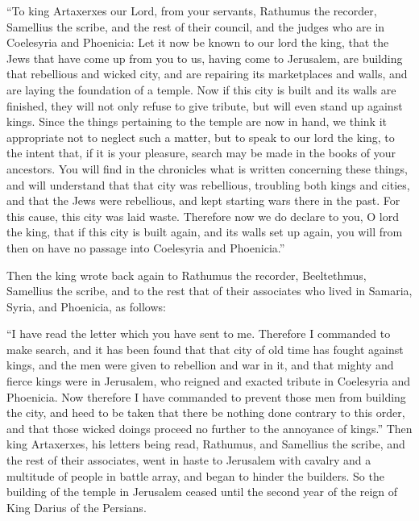  ``To king Artaxerxes our Lord, from your servants,
Rathumus the recorder, Samellius the scribe, and the rest of their
council, and the judges who are in Coelesyria and Phoenicia:
 Let it now be known to our lord the king, that the Jews
that have come up from you to us, having come to Jerusalem, are building
that rebellious and wicked city, and are repairing its marketplaces and
walls, and are laying the foundation of a temple.  Now if
this city is built and its walls are finished, they will not only refuse
to give tribute, but will even stand up against kings. 
Since the things pertaining to the temple are now in hand, we think it
appropriate not to neglect such a matter,  but to speak
to our lord the king, to the intent that, if it is your pleasure, search
may be made in the books of your ancestors.  You will
find in the chronicles what is written concerning these things, and will
understand that that city was rebellious, troubling both kings and
cities,  and that the Jews were rebellious, and kept
starting wars there in the past. For this cause, this city was laid
waste.  Therefore now we do declare to you, O lord the
king, that if this city is built again, and its walls set up again, you
will from then on have no passage into Coelesyria and Phoenicia.''

 Then the king wrote back again to Rathumus the recorder,
Beeltethmus, Samellius the scribe, and to the rest that of their
associates who lived in Samaria, Syria, and Phoenicia, as follows:

 ``I have read the letter which you have sent to me.
Therefore I commanded to make search, and it has been found that that
city of old time has fought against kings,  and the men
were given to rebellion and war in it, and that mighty and fierce kings
were in Jerusalem, who reigned and exacted tribute in Coelesyria and
Phoenicia.  Now therefore I have commanded to prevent
those men from building the city, and heed to be taken that there be
nothing done contrary to this order,  and that those
wicked doings proceed no further to the annoyance of kings.''
 Then king Artaxerxes, his letters being read, Rathumus,
and Samellius the scribe, and the rest of their associates, went in
haste to Jerusalem with cavalry and a multitude of people in battle
array, and began to hinder the builders. So the building of the temple
in Jerusalem ceased until the second year of the reign of King Darius of
the Persians.


